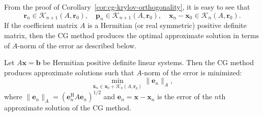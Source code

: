 {From the proof of Corollary\ \ref{cor:cg-krylov-orthogonality}, it is easy to see that}
\begin{equation}\label{eq:cg-krylov-membership}
\bm r_n\in\mathcal K_{n+1}(A,\bm r_0),\quad\bm p_n\in\mathcal K_{n+1}(A,\bm r_0),\quad\bm x_n-\bm x_0\in\mathcal K_n(A,\bm r_0).
\end{equation}
{If the coefficient matrix $A$ is a Hermitian (or real symmetric) positive definite matrix, then the CG method produces the optimal approximate solution in terms of $A$-norm of the error as described below.}
\begin{Theorem}\label{thm:cg-energy-optimality}
{Let $A\bm x=\bm b$ be Hermitian positive definite linear systems. Then the CG method produces approximate solutions such that $A$-norm of the error is minimized:}
\[\min_{\bm x_n\in\bm x_0+\mathcal K_n(A,\bm r_0)}\|\bm e_n\|_A,\]
{where $\|\bm e_n\|_A=(\bm e_n^{\mathrm H}A\bm e_n)^{1/2}$ and $\bm e_n=\bm x-\bm x_n$ is the error of the $n$th approximate solution of the CG method.}
\end{Theorem}
